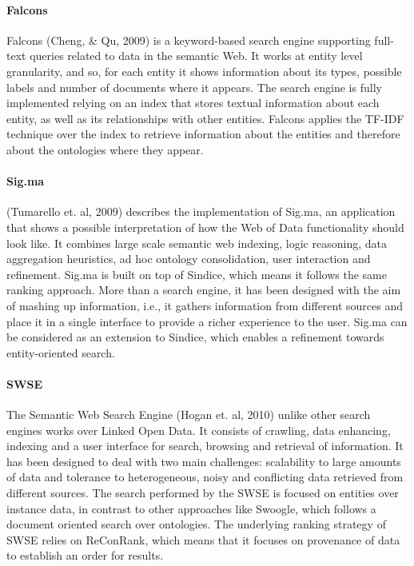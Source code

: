 \paragraph{Falcons}
Falcons (Cheng, \& Qu, 2009) is a keyword-based search engine supporting full-text queries related to data in the semantic Web. It works at entity level granularity, and so, for each entity it shows information about its types, possible labels and number of documents where it appears. The search engine is fully implemented relying on an index that stores textual information about each entity, as well as its relationships with other entities. Falcons applies the TF-IDF technique over the index to retrieve information about the entities and therefore about the ontologies where they appear.

\paragraph{Sig.ma}
(Tumarello et. al, 2009) describes the implementation of Sig.ma, an application that shows a possible interpretation of how the Web of Data functionality should look like. It combines large scale semantic web indexing, logic reasoning, data aggregation heuristics, ad hoc ontology consolidation, user interaction and refinement.
Sig.ma is built on top of Sindice, which means it follows the same ranking approach. More than a search engine, it has been designed with the aim of mashing up information, i.e., it gathers information from different sources and place it in a single interface to provide a richer experience to the user. Sig.ma can be considered as an extension to Sindice, which enables a refinement towards entity-oriented search.

\paragraph{SWSE}
The Semantic Web Search Engine (Hogan et. al, 2010) unlike other search engines works over Linked Open Data. It consists of crawling, data enhancing, indexing and a user interface for search, browsing and retrieval of information. It has been designed to deal with two main challenges: scalability to large amounts of data and tolerance to heterogeneous, noisy and conflicting data retrieved from different sources.
The search performed by the SWSE is focused on entities over instance data, in contrast to other approaches like Swoogle, which follows a document oriented search over ontologies. The underlying ranking strategy of SWSE relies on ReConRank, which means that it focuses on provenance of data to establish an order for results.


